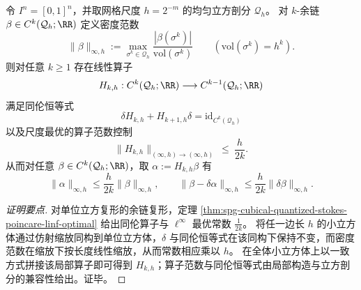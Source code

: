 \begin{theorem}\label{thm:conclusion-uniform-grid-quantized-stokes-poincare-scale}
令 \(I^n=[0,1]^n\)，并取网格尺度 \(h=2^{-m}\) 的均匀立方剖分 \(\mathcal Q_h\)。
对 \(k\)-余链 \(\beta\in C^k(\mathcal Q_h;\RR)\) 定义密度范数
\[
\|\beta\|_{\infty,h}:=\max_{\sigma^k\in\mathcal Q_h}\frac{|\beta(\sigma^k)|}{\mathrm{vol}(\sigma^k)}
\qquad(\mathrm{vol}(\sigma^k)=h^k).
\]
则对任意 \(k\ge 1\) 存在线性算子
\[
H_{k,h}:C^k(\mathcal Q_h;\RR)\longrightarrow C^{k-1}(\mathcal Q_h;\RR)
\]
满足同伦恒等式
\[
\delta H_{k,h}+H_{k+1,h}\delta=\mathrm{id}_{C^k(\mathcal Q_h)}
\]
以及尺度最优的算子范数控制
\[
\|H_{k,h}\|_{(\infty,h)\to(\infty,h)}\ \le\ \frac{h}{2k}.
\]
从而对任意 \(\beta\in C^k(\mathcal Q_h;\RR)\)，取 \(\alpha:=H_{k,h}\beta\) 有
\[
\|\alpha\|_{\infty,h}\le \frac{h}{2k}\|\beta\|_{\infty,h},
\qquad
\|\beta-\delta\alpha\|_{\infty,h}\le \frac{h}{2k}\|\delta\beta\|_{\infty,h}.
\]
\end{theorem}
\begin{proof}[证明要点]
对单位立方复形的余链复形，定理 \ref{thm:spg-cubical-quantized-stokes-poincare-linf-optimal} 给出同伦算子与 \(\ell^\infty\) 最优常数 \(\frac{1}{2k}\)。
将任一边长 \(h\) 的小立方体通过仿射缩放同构到单位立方体，\(\delta\) 与同伦恒等式在该同构下保持不变，而密度范数在缩放下按长度线性缩放，从而常数相应乘以 \(h\)。
在全体小立方体上以一致方式拼接该局部算子即可得到 \(H_{k,h}\)；算子范数与同伦恒等式由局部构造与立方剖分的兼容性给出。证毕。
\end{proof}


